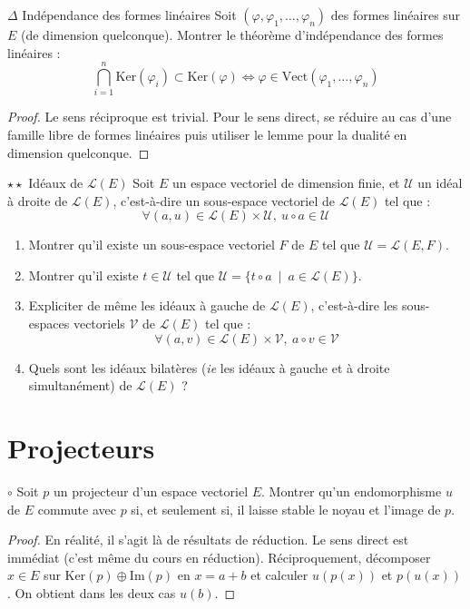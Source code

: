 \documentclass[french,a4paper]{article}
\renewcommand{\ker}{\text{Ker}}
\newcommand{\im}{\text{Im}}
\theoremstyle{plain}
\theoremstyle{definition}
\theoremstyle{remark}
\begin{document}
\begin{ex}[Moulin.EV.51]{$\Delta$ Indépendance des formes linéaires} Soit $(\varphi,\varphi_1,\ldots,\varphi_n)$ des formes linéaires sur $E$ (de dimension quelconque). Montrer le théorème d'indépendance des formes linéaires : $$\bigcap_{i=1}^n\ker(\varphi_i)\subset \ker(\varphi)\iff\varphi\in\text{Vect}(\varphi_1,\ldots,\varphi_n)$$
\end{ex}
\begin{proof}
	Le sens réciproque est trivial. Pour le sens direct, se réduire au cas d'une famille libre de formes linéaires puis utiliser le lemme pour la dualité en dimension quelconque.
\end{proof}

\begin{ex}[Moulin.EV.52]{$\star\star$ Idéaux de $\mathcal{L}(E)$}
	Soit $E$ un espace vectoriel de dimension finie, et $\mathcal{U}$ un idéal à droite de $\mathcal{L}(E)$, c'est-à-dire un sous-espace vectoriel de $\mathcal{L}(E)$ tel que : $$\forall (a,u)\in\mathcal{L}(E)\times \mathcal{U},\ u\circ a\in\mathcal{U}$$
	\begin{enumerate}
		\item Montrer qu'il existe un sous-espace vectoriel $F$ de $E$ tel que $\mathcal{U}=\mathcal{L}(E,F)$.
		\item Montrer qu'il existe $t\in\mathcal{U}$ tel que $\mathcal{U}=\{t\circ a\ \mid\ a\in\mathcal{L}(E)\}$.
		\item Expliciter de même les idéaux à gauche de $\mathcal{L}(E)$, c'est-à-dire les sous-espaces vectoriels $\mathcal{V}$ de $\mathcal{L}(E)$ tel que : $$\forall (a,v)\in\mathcal{L}(E)\times \mathcal{V},\ a\circ v\in\mathcal{V}$$
		\item Quels sont les idéaux bilatères (\textit{ie} les idéaux à gauche et à droite simultanément) de $\mathcal{L}(E)$ ?
	\end{enumerate}
\end{ex}

\section{Projecteurs}

\begin{ex}[Moulin.EV.53]{$\circ$}
	Soit $p$ un projecteur d'un espace vectoriel $E$. Montrer qu'un endomorphisme $u$ de $E$ commute avec $p$ si, et seulement si, il laisse stable le noyau et l'image de $p$.
\end{ex}
\begin{proof}
	En réalité, il s'agit là de résultats de réduction. Le sens direct est immédiat (c'est même du cours en réduction). Réciproquement, décomposer $x\in E$ sur $\ker(p)\oplus\im(p)$ en $x=a+b$ et calculer $u(p(x))$ et $p(u(x))$. On obtient dans les deux cas $u(b)$.
\end{proof}
\end{document}
